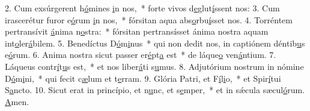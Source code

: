 2. Cum exsúrgerent h\uline{ó}mines \uline{i}n nos,~* forte vivos d\uline{e}glut\uline{í}ssent nos:
3. Cum irascerétur furor e\uline{ó}rum \uline{i}n nos,~* fórsitan aqua abs\uline{o}rbu\uline{í}sset nos.
4. Torréntem pertransívit \uline{á}nima n\uline{o}stra:~* fórsitan pertransísset ánima nostra aquam int\uline{o}ler\uline{á}bilem.
5. Benedíctus D\uline{ó}m\uline{i}nus~* qui non dedit nos, in captiónem déntib\uline{u}s e\uline{ó}rum.
6. Anima nostra sicut passer er\uline{é}pt\uline{a} est~* de láque\uline{o} ven\uline{á}ntium.
7. Láqueus contr\uline{í}t\uline{u}s est,~* et nos liber\uline{á}ti s\uline{u}mus.
8. Adjutórium nostrum in nómine D\uline{ó}m\uline{i}ni,~* qui fecit c\uline{æ}lum et t\uline{e}rram.
9. Glória Patri, et F\uline{í}l\uline{i}o,~* et Spir\uline{í}tui S\uline{a}ncto.
10. Sicut erat in princípio, et n\uline{u}nc, et s\uline{e}mper,~* et in sǽcula sæcul\uline{ó}rum. \uline{A}men.
